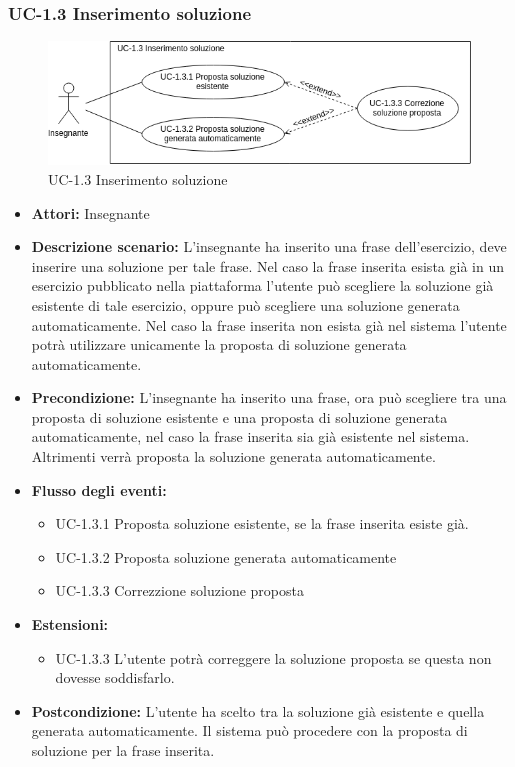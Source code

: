 \subsubsection{UC-1.3 Inserimento soluzione}
\begin{figure}[htbp]
	\centering
	\includegraphics[scale=0.7]{images/UC-1_3.png}
	\caption{UC-1.3 Inserimento soluzione}
\end{figure}
\begin{itemize}
\item \textbf{Attori: }Insegnante
\item \textbf{Descrizione scenario: }L'insegnante ha inserito una frase dell'esercizio, deve inserire una soluzione per tale frase. Nel caso la frase inserita esista già in un esercizio pubblicato nella piattaforma l'utente può scegliere la soluzione già esistente di tale esercizio, oppure può scegliere una soluzione generata automaticamente. Nel caso la frase inserita non esista già nel sistema l'utente potrà utilizzare unicamente la proposta di soluzione generata automaticamente.
\item \textbf{Precondizione: }L'insegnante ha inserito una frase, ora può scegliere tra una proposta di soluzione esistente e una proposta di soluzione generata automaticamente, nel caso la frase inserita sia già esistente nel sistema. Altrimenti verrà proposta la soluzione generata automaticamente.
		\item \textbf{Flusso degli eventi: }
		\begin{itemize}
		\item UC-1.3.1 Proposta soluzione esistente, se la frase inserita esiste già.
		\item UC-1.3.2 Proposta soluzione generata automaticamente
		\item UC-1.3.3 Correzzione soluzione proposta
		\end{itemize}
\item \textbf{Estensioni: }
		\begin{itemize}
		\item UC-1.3.3 L'utente potrà correggere la soluzione proposta se questa non dovesse soddisfarlo.
		\end{itemize}
\item \textbf{Postcondizione: }L'utente ha scelto tra la soluzione già esistente e quella generata automaticamente. Il sistema può procedere con la proposta di soluzione per la frase inserita.
\end{itemize}
